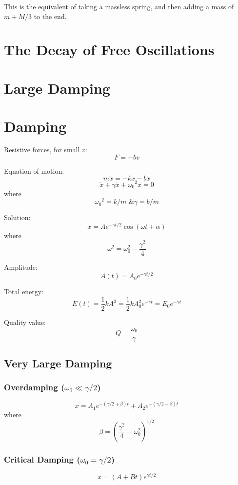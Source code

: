 \documentclass[11pt,letterpaper,titlepage,oneside]{book}
\begin{document}
This is the equivalent of taking a massless spring, and then adding a mass of $m + M/3$ to the end.


\section{The Decay of Free Oscillations}

\section{Large Damping}


\section{Damping}
Resistive forces, for small $v$: \[ F=-bv \]

Equation of motion:
\[ m\ddot{x} = -kx - b\dot{x} \]
\[ \ddot{x} + \gamma \dot{x} + {\omega_0}^2 x = 0 \]
where
\[ {\omega_0}^2 = k/m \text{ \& } \gamma = b/m \]

Solution:
\[ x = A e^{-\gamma t/2} \cos(\omega t + \alpha) \]
where
\[ \omega ^2 = \omega_0^2 - \frac{\gamma^2}{4} \]

Amplitude:
\[ A(t) = A_0 e^{-\gamma t/2} \]

Total energy:
\[ E(t) = \frac{1}{2}kA^2 = \frac{1}{2}kA_0^2 e^{-\gamma t} = E_0 e^{-\gamma t} \]

Quality value:
\[ Q = \frac{\omega_0}{\gamma} \]

\subsection{Very Large Damping}
\subsubsection{Overdamping ($ \omega_0 \ll \gamma/2 $)}
\[ x = A_1 e^{-(\gamma/2 + \beta)t} + A_2 e^{-(\gamma/2-\beta)t} \]
where \[ \beta = \left(\frac{\gamma^2}{4}-\omega_0^2 \right)^{1/2} \]

\subsubsection{Critical Damping ($ \omega_0 = \gamma/2 $)}
\[ x = (A + Bt) e^{\gamma t/2}\]
\end{document}
